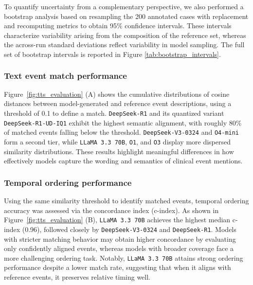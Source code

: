 \documentclass[pdflatex,sn-mathphys-num]{sn-jnl}%
\theoremstyle{thmstyleone}%
\theoremstyle{thmstyletwo}%
\theoremstyle{thmstylethree}%
\begin{document}
To quantify uncertainty from a complementary perspective, we also performed a bootstrap analysis based on resampling the 200 annotated cases with replacement and recomputing metrics to obtain 95\% confidence intervals. These intervals characterize variability arising from the composition of the reference set, whereas the across-run standard deviations reflect variability in model sampling. The full set of bootstrap intervals is reported in Figure \ref{tab:bootstrap_intervals}.




\subsubsection{Text event match performance}
Figure~\ref{fig:tts_evaluation} (A) shows the cumulative distributions of cosine distances between model-generated and reference event descriptions, using a threshold of 0.1 to define a match. \texttt{DeepSeek-R1} and its quantized variant \texttt{DeepSeek-R1-UD-IQ1} exhibit the highest semantic alignment, with roughly 80\% of matched events falling below the threshold. \texttt{DeepSeek-V3-0324} and \texttt{O4-mini} form a second tier, while \texttt{LLaMA 3.3 70B}, \texttt{O1}, and \texttt{O3} display more dispersed similarity distributions. These results highlight meaningful differences in how effectively models capture the wording and semantics of clinical event mentions.

\subsubsection{Temporal ordering performance}
Using the same similarity threshold to identify matched events, temporal ordering accuracy was assessed via the concordance index (c-index). As shown in Figure~\ref{fig:tts_evaluation} (B), \texttt{LLaMA 3.3 70B} achieves the highest median c-index (0.96), followed closely by \texttt{DeepSeek-V3-0324} and \texttt{DeepSeek-R1}. Models with stricter matching behavior may obtain higher concordance by evaluating only confidently aligned events, whereas models with broader coverage face a more challenging ordering task. Notably, \texttt{LLaMA 3.3 70B} attains strong ordering performance despite a lower match rate, suggesting that when it aligns with reference events, it preserves relative timing well.
\end{document}
